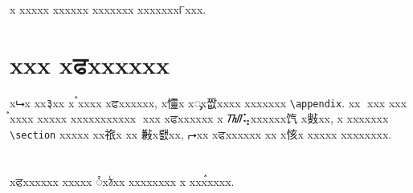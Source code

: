 \documentclass[
aps,%
12pt,%
final,%
notitlepage,%
oneside,%
onecolumn,%
nobibnotes,%
nofootinbib,%
superscriptaddress,%
noshowpacs,%
centertags]%
{revtex4}
\begin{document}
\begin{acknowledgments}
x xxxxx xxxxxx xxxxxxx xxxxxxx୮xxx.
\end{acknowledgments}

\appendix

\section{xxx xਫxxxxxx}

x⮡x xx३xx x ࠧxxxx xਫxxxxxx, x㦭x xᯮx짮xxxx xxxxxxx
\verb+\appendix+. xx᫥ xxx xxx ࠧxxxx xxxxx xxxxxxxxxxx ᫮xxx
xਫxxxxxx x ᮮ⢥xxxxxx饩 x㪢xx, x xxxxxxx \verb+\section+
xxxxx xx祣x xx 㪠x뢠xx, ⮣xx xਫxxxxxx xx x㤥x xxxxx
xxxxxxxx.

\section{}

xਫxxxxxx xxxxx ᮤxঠxx xxxxxxxx x xxxࠧxxxx.
\end{document}
